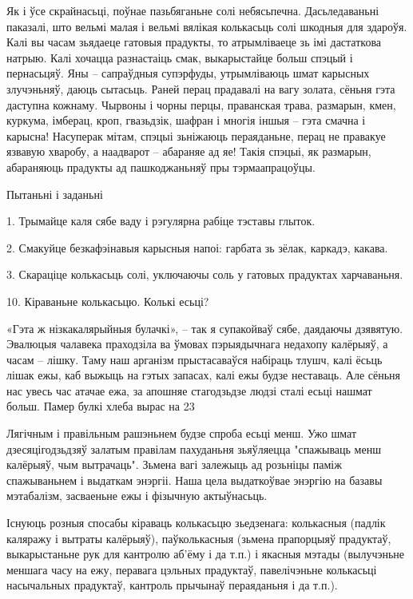 Як і ўсе скрайнасьці, поўнае пазьбяганьне солі небясьпечна. Дасьледаваньні паказалі, што вельмі малая і вельмі вялікая колькасьць солі шкодныя для здароўя. Калі вы часам зьядаеце гатовыя прадукты, то атрымліваеце зь імі дастаткова натрыю. Калі хочацца разнастаіць смак, выкарыстайце больш спэцый і пернасьцяў. Яны – сапраўдныя супэрфуды, утрымліваюць шмат карысных злучэньняў, даюць сытасьць. Раней перац прадавалі на вагу золата, сёньня гэта даступна кожнаму. Чырвоны і чорны перцы, праванская трава, размарын, кмен, куркума, імберац, кроп, гвазьдзік, шафран і многія іншыя – гэта смачна і карысна! Насуперак мітам, спэцыі зьніжаюць пераяданьне, перац не правакуе язвавую хваробу, а наадварот – абараняе ад яе! Такія спэцыі, як размарын, абараняюць прадукты ад пашкоджаньняў пры тэрмаапрацоўцы.

Пытаньні і заданьні

1. Трымайце каля сябе ваду і рэгулярна рабіце тэставы глыток.

2. Смакуйце безкафэінавыя карысныя напоі: гарбата зь зёлак, каркадэ, какава.

3. Скараціце колькасьць солі, уключаючы соль у гатовых прадуктах харчаваньня.


10. Кіраваньне колькасьцю. Колькі есьці?

«Гэта ж нізкакалярыйныя булачкі», – так я супакойваў сябе, даядаючы дзявятую. Эвалюцыя чалавека праходзіла ва ўмовах пэрыядычнага недахопу калёрыяў, а часам – лішку. Таму наш арганізм прыстасаваўся набіраць тлушч, калі ёсьць лішак ежы, каб выжыць на гэтых запасах, калі ежы будзе неставаць. Але сёньня нас увесь час атачае ежа, за апошняе стагодзьдзе людзі сталі есьці нашмат больш. Памер булкі хлеба вырас на 23%

Лягічным і правільным рашэньнем будзе спроба есьці менш. Ужо шмат дзесяцігодзьдзяў залатым правілам пахуданьня зьяўляецца "спажываць менш калёрыяў, чым вытрачаць". Зьмена вагі залежыць ад розьніцы паміж спажываньнем і выдаткам энэргіі. Наша цела выдаткоўвае энэргію на базавы мэтабалізм, засваеньне ежы і фізычную актыўнасьць.

Існуюць розныя спосабы кіраваць колькасьцю зьедзенага: колькасныя (падлік каляражу і вытраты калёрыяў), паўколькасныя (зьмена прапорцыяў прадуктаў, выкарыстаньне рук для кантролю аб'ёму і да т.п.) і якасныя мэтады (вылучэньне меншага часу на ежу, перавага цэльных прадуктаў, павелічэньне колькасьці насычальных прадуктаў, кантроль прычынаў пераяданьня і да т.п.).

